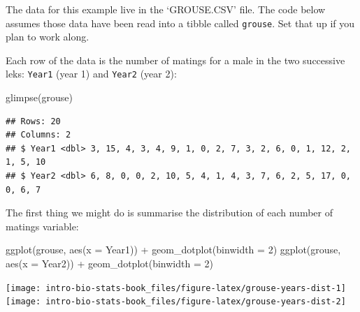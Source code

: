 \documentclass[
]{book}
\newenvironment{Shaded}{\begin{snugshade}}{\end{snugshade}}
\newcommand{\AttributeTok}[1]{\textcolor[rgb]{0.77,0.63,0.00}{#1}}
\newcommand{\DecValTok}[1]{\textcolor[rgb]{0.00,0.00,0.81}{#1}}
\newcommand{\FunctionTok}[1]{\textcolor[rgb]{0.00,0.00,0.00}{#1}}
\newcommand{\NormalTok}[1]{#1}
\newcommand{\SpecialCharTok}[1]{\textcolor[rgb]{0.00,0.00,0.00}{#1}}
\newenvironment{greybox}{
  \definecolor{shadecolor}{rgb}{0.95,0.95,0.95}  %
  \color{black}
  \begin{shaded}}
 {\end{shaded}}
\newenvironment{infobox}[1]
  {
  \begin{itemize}
  \renewcommand{\labelitemi}{
    \raisebox{-.7\height}[0pt][0pt]{
      {\setkeys{Gin}{width=3em,keepaspectratio}
        \texttt{[image: images/\#1]}}
    }
  }
  \setlength{\fboxsep}{1em}
  \begin{greybox}
  \item
  }
  {
  \end{greybox}
  \end{itemize}
  }
\begin{document}
\begin{infobox}{action}

\hypertarget{section-24}{%
\subsubsection*{}\label{section-24}}

The data for this example live in the `GROUSE.CSV' file. The code below assumes those data have been read into a tibble called \texttt{grouse}. Set that up if you plan to work along.

\end{infobox}

Each row of the data is the number of matings for a male in the two successive leks: \texttt{Year1} (year 1) and \texttt{Year2} (year 2):

\begin{Shaded}
\begin{Highlighting}[]
\FunctionTok{glimpse}\NormalTok{(grouse)}
\end{Highlighting}
\end{Shaded}

\begin{verbatim}
## Rows: 20
## Columns: 2
## $ Year1 <dbl> 3, 15, 4, 3, 4, 9, 1, 0, 2, 7, 3, 2, 6, 0, 1, 12, 2, 1, 5, 10
## $ Year2 <dbl> 6, 8, 0, 0, 2, 10, 5, 4, 1, 4, 3, 7, 6, 2, 5, 17, 0, 0, 6, 7
\end{verbatim}

The first thing we might do is summarise the distribution of each number of matings variable:

\begin{Shaded}
\begin{Highlighting}[]
\FunctionTok{ggplot}\NormalTok{(grouse, }\FunctionTok{aes}\NormalTok{(}\AttributeTok{x =}\NormalTok{ Year1)) }\SpecialCharTok{+} \FunctionTok{geom\_dotplot}\NormalTok{(}\AttributeTok{binwidth =} \DecValTok{2}\NormalTok{)}
\FunctionTok{ggplot}\NormalTok{(grouse, }\FunctionTok{aes}\NormalTok{(}\AttributeTok{x =}\NormalTok{ Year2)) }\SpecialCharTok{+} \FunctionTok{geom\_dotplot}\NormalTok{(}\AttributeTok{binwidth =} \DecValTok{2}\NormalTok{)}
\end{Highlighting}
\end{Shaded}

\texttt{[image: intro-bio-stats-book\_files/figure-latex/grouse-years-dist-1]} \texttt{[image: intro-bio-stats-book\_files/figure-latex/grouse-years-dist-2]}
\end{document}

